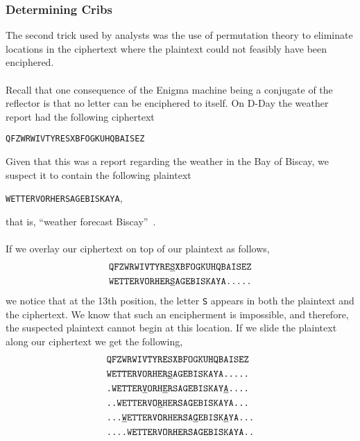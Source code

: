 \subsubsection{Determining Cribs}
The second trick used by analysts was the use of permutation theory to
eliminate locations in the ciphertext where the plaintext could not
feasibly have been enciphered.
\\\\Recall that one consequence of the Enigma machine being a
conjugate of the reflector is that no letter can be enciphered to
itself. On D-Day the weather report had the following ciphertext
\begin{center}
  \texttt{QFZWRWIVTYRESXBFOGKUHQBAISEZ}
\end{center}
Given that this was a report regarding the weather in the Bay of Biscay, we
suspect it to contain the following plaintext
\begin{center}
  \texttt{WETTERVORHERSAGEBISKAYA},
\end{center}
that is, ``weather forecast Biscay''~\cite{ellsburyTuringBombe}.
\\\\If we overlay our ciphertext on top of our plaintext as follows,
\begin{align*}
  & \texttt{QFZWRWIVTYRE}{\uline{\texttt{S}}}\texttt{XBFOGKUHQBAISEZ} \\
  & \texttt{WETTERVORHER}{\uline{\texttt{S}}}\texttt{AGEBISKAYA.....}
\end{align*}
we notice that at the 13th position, the letter \texttt{S} appears in
both the plaintext and the ciphertext. We know that such an
encipherment is impossible, and therefore, the suspected plaintext
cannot begin at this location. If we slide the plaintext along our
ciphertext we get the following,
\begin{align*}
  & \texttt{QFZWRWIVTYRESXBFOGKUHQBAISEZ}
  \\
  & \texttt{WETTERVORHER}{\uline{\texttt{S}}}\texttt{AGEBISKAYA.....}
  \\
  &
  \texttt{.WETTER}{\uline{\texttt{V}}}\texttt{ORH}{\uline{\texttt{E}}}\texttt{RSAGEBISKAY}{\uline{\texttt{A}}}\texttt{....}
  \\
  & \texttt{..WETTER}\texttt{VO}{\uline{\texttt{R}}}\texttt{HERSAGEBISKAYA...}
  \\
  &
  \texttt{...}{\uline{\texttt{W}}}\texttt{ETTERVORHERSA}{\uline{\texttt{G}}}\texttt{EBISK}{\uline{\texttt{A}}}\texttt{YA...}
  \\
  & \texttt{....WETTERVORHERSAGEBISKAYA..}
  \\
\end{align*}
